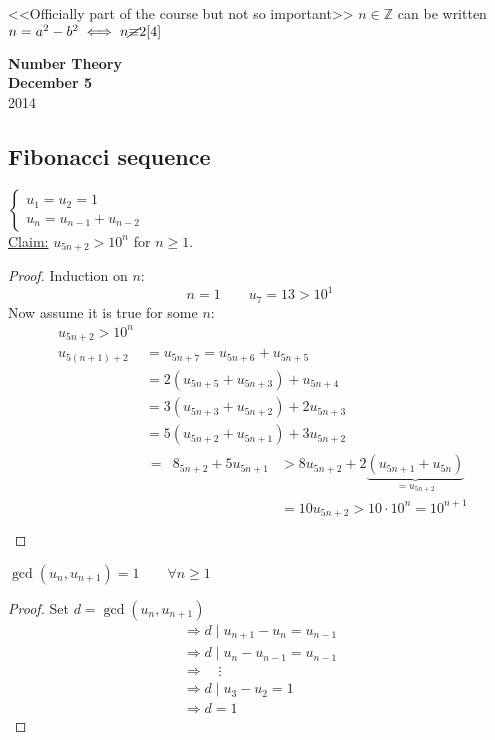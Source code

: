 \documentclass{report}
\newcommand{\nequiv}{\cancel{\equiv}}
\begin{document}
\begin{thm} <<Officially part of the course but not so important>> $n\in \mathbb{Z}$ can be written $n=a^2-b^2 \iff n\nequiv 2[4]$
\end{thm}


\newpage



{\centering
\Large
\textbf{Number Theory}\\
\normalsize
\textbf{December 5}\\
2014\\
}
\vspace{10mm}
\subsection*{Fibonacci sequence}
$	\left \{
	\begin{array}{lcl}
		u_1=u_2=1\\
		u_n=u_{n-1}+u_{n-2}
	\end{array}
	\right.$\\
	
	
\underline{Claim:} $u_{5n+2}>10^n$ for $n\geq1$.
\begin{proof} Induction on $n$: \[ n=1\qquad u_7=13>10^1\]
							Now assume it is true for some $n$:
							\[\begin{array}{lcl}
										&u_{5n+2}>10^n&\\
										&u_{5(n+1)+2}&=u_{5n+7}=u_{5n+6}+u_{5n+5}\\
													&&			=2(u_{5n+5}+u_{5n+3})+u_{5n+4}\\
													&&			=3(u_{5n+3}+u_{5n+2})+2u_{5n+3}\\
													&&			=5(u_{5n+2}+u_{5n+1})+3u_{5n+2}\\
													&&			\begin{array}{lcl}
																		=&8_{5n+2}+5u_{5n+1}&>8u_{5n+2}+2\underbrace{(u_{5n+1}+u_{5n})}_{=u_{5n+2}}\\
																		&&								 =10u_{5n+2}>10\cdot 10^n=10^{n+1}\\	
																		\end{array}
							\end{array}\]
\end{proof}
\begin{thm} $\gcd(u_n,u_{n+1})=1 \qquad \forall n \geq 1$
\end{thm}
\begin{proof}
							Set $d=\gcd(u_n,u_{n+1})$\\
							\[\begin{array}{lcl}
								\Rightarrow d \mid u_{n+1}-u_n=u_{n-1}\\
								\Rightarrow d\mid u_n-u_{n-1}=u_{n-1}\\
								\Rightarrow \quad \vdots\\
								\Rightarrow d\mid u_3-u_2=1\\
								\Rightarrow d=1
								\end{array}\]
\end{proof}
\end{document}

